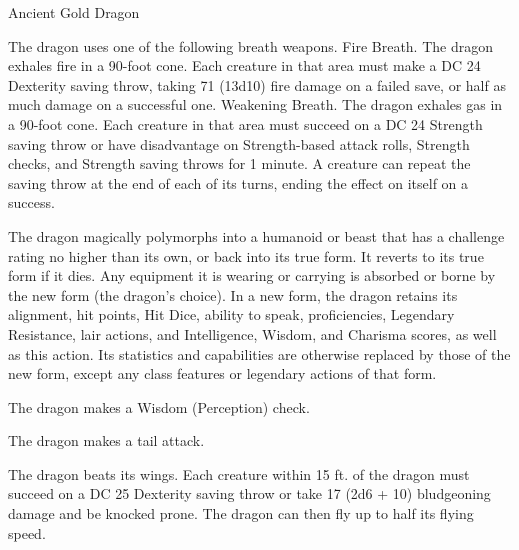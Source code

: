 \begin{monsterbox}{Ancient Gold Dragon}
\begin{monsteraction}
\end{monsteraction}
\begin{monsteraction}
The dragon uses one of the following breath weapons.
Fire Breath. The dragon exhales fire in a 90-foot cone. Each creature in that area must make a DC 24 Dexterity saving throw, taking 71 (13d10) fire damage on a failed save, or half as much damage on a successful one.
Weakening Breath. The dragon exhales gas in a 90-foot cone. Each creature in that area must succeed on a DC 24 Strength saving throw or have disadvantage on Strength-based attack rolls, Strength checks, and Strength saving throws for 1 minute. A creature can repeat the saving throw at the end of each of its turns, ending the effect on itself on a success.
\end{monsteraction}
\begin{monsteraction}
The dragon magically polymorphs into a humanoid or beast that has a challenge rating no higher than its own, or back into its true form. It reverts to its true form if it dies. Any equipment it is wearing or carrying is absorbed or borne by the new form (the dragon's choice).
In a new form, the dragon retains its alignment, hit points, Hit Dice, ability to speak, proficiencies, Legendary Resistance, lair actions, and Intelligence, Wisdom, and Charisma scores, as well as this action. Its statistics and capabilities are otherwise replaced by those of the new form, except any class features or legendary actions of that form.
\end{monsteraction}
\begin{monsteraction}[Detect]
The dragon makes a Wisdom (Perception) check.
\end{monsteraction}
\begin{monsteraction}
The dragon makes a tail attack.
\end{monsteraction}
\begin{monsteraction}
The dragon beats its wings. Each creature within 15 ft. of the dragon must succeed on a DC 25 Dexterity saving throw or take 17 (2d6 + 10) bludgeoning damage and be knocked prone. The dragon can then fly up to half its flying speed.
\end{monsteraction}
\end{monsterbox}